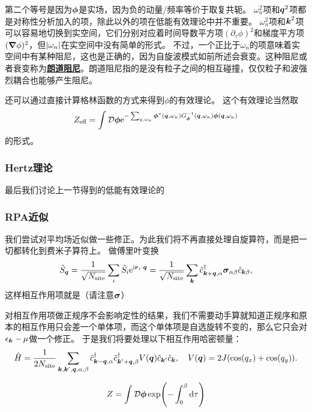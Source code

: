 \documentclass[hyperref, UTF8, a4paper]{ctexart}
\newcommand*{\ii}{\mathrm{i}}
\newcommand*{\ee}{\mathrm{e}}
\newcommand*{\fd}[1]{\mathcal{D} #1}
\newcommand*{\concept}[1]{\underline{\textbf{#1}}}
\begin{document}
第二个等号是因为$\vb*{\phi}$是实场，因为负的动量/频率等价于取复共轭。
$\omega_n^2$项和$\vb*{q}^2$项都是对称性分析加入的项，除此以外的项在低能有效理论中并不重要。%
$\omega_n^2$项和$\vb*{k}^2$项可以容易地切换到实空间，它们分别对应着时间导数平方项$(\partial_\tau \phi)^2$和梯度平方项$(\grad{\phi})^2$，但$\abs{\omega_n}$在实空间中没有简单的形式。
不过，一个正比于$\omega_n$的项意味着实空间中有某种阻尼，这也是正确的，因为自旋波模式如前所述会衰变。这种阻尼或者衰变称为\concept{朗道阻尼}。朗道阻尼指的是没有粒子之间的相互碰撞，仅仅粒子和波强烈耦合也能够产生阻尼。

还可以通过直接计算格林函数的方式来得到$\phi$的有效理论。
这个有效理论当然取
\[
    Z_\text{eff} = \int \mathcal{D}\vb*{\phi} \ee^{- \sum_{q, \omega_n} \vb*{\phi}^*(\vb*{q}, \omega_n) G^{-1}_{\vb*{\phi}}(\vb*{q}, \omega_n) \vb*{\phi}(\vb*{q}, \omega_n)}
\]
的形式。

\subsubsection{Hertz理论}

最后我们讨论上一节得到的低能有效理论的

\subsubsection{RPA近似}

我们尝试对平均场近似做一些修正。为此我们将不再直接处理自旋算符，而是把一切都转化到费米子算符上。
做傅里叶变换
\[
    \hat{S}_{\vb*{q}} = \frac{1}{\sqrt{N_\text{site}}} \sum_i \hat{S}_i \ee^{\ii \vb*{r}_i \cdot \vb*{q}} = \frac{1}{\sqrt{N_\text{site}}} \sum_{\vb*{k}} \hat{c}^\dagger_{\vb*{k}+\vb*{q}, \alpha} \vb*{\sigma}_{\alpha \beta} \hat{c}_{\vb*{k} \beta},
\]
这样相互作用项就是（请注意$\vb*{\sigma}$）

对相互作用项做正规序不会影响定性的结果，我们不需要动手算就知道正规序和原本的相互作用只会差一个单体项，而这个单体项是自选旋转不变的，那么它只会对$\epsilon_{\vb*{k}} - \mu$做一个修正。
于是我们将要处理以下相互作用哈密顿量：%
\begin{equation}
    \hat{H} = \frac{1}{2 N_\text{site}} \sum_{\vb*{k}, \vb*{k}', \vb*{q}, \alpha, \beta} \hat{c}^\dagger_{\vb*{k}-\vb*{q}, \alpha} \hat{c}^\dagger_{\vb*{k}'+\vb*{q}, \beta} V(\vb*{q}) \hat{c}_{\vb*{k}'} \hat{c}_{\vb*{k}}, \quad V(\vb*{q}) = 2 J (\cos(q_x) + \cos(q_y)).
\end{equation}

\begin{equation}
    Z = \int \fd{\vb*{\phi}} \exp(- \int_0^\beta \dd{\tau} )
\end{equation}
\end{document}
